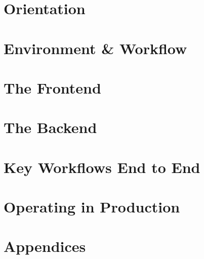 \documentclass[11pt,oneside]{book}
\begin{document}


\frontmatter



\tableofcontents

\mainmatter

\part{Orientation}




\part{Environment \& Workflow}




\part{The Frontend}





\part{The Backend}






\part{Key Workflows End to End}




\part{Operating in Production}






\appendix
\part{Appendices}



\end{document}
